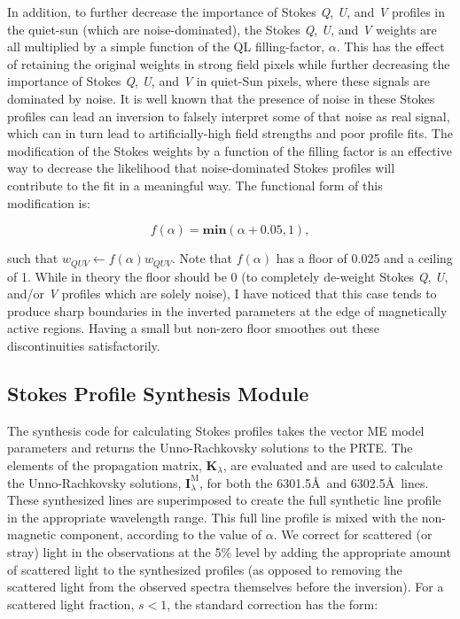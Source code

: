 \documentclass[11pt]{article}
\begin{document}
In addition, to further decrease the importance of Stokes \textit{Q}, \textit{U}, and \textit{V}
profiles in the quiet-sun (which are noise-dominated), the Stokes \textit{Q}, \textit{U}, and \textit{V} weights are all
multiplied by a simple function of the QL filling-factor, $\alpha$.  This has the effect of retaining the
original weights in strong field pixels while further decreasing the importance of Stokes \textit{Q},
\textit{U}, and \textit{V} in quiet-Sun pixels, where these signals are dominated by noise.  It is
well known that the presence of noise in these Stokes profiles can lead an inversion to falsely
interpret some of that noise as real signal, which can in turn lead to artificially-high field strengths
and poor profile fits.  The modification of the Stokes weights by a function of the filling factor
is an effective way to decrease the likelihood that noise-dominated Stokes profiles will contribute
to the fit in a meaningful way.  The functional form of this modification is:

\begin{equation}
f(\alpha) = \mathrm{\mathbf{min}}\left(\alpha+0.05,1\right), 
\end{equation}

such that $w_{QUV} \leftarrow f(\alpha)w_{QUV}$.
Note that $f(\alpha)$ has a floor of 0.025 and a ceiling of 1.  While in theory the floor should be 0
(to completely de-weight Stokes \textit{Q}, \textit{U}, and/or \textit{V} profiles which are solely
noise), I have noticed that this case tends to produce sharp boundaries in the inverted parameters at
the edge of magnetically active regions.  Having a small but non-zero floor smoothes out these
discontinuities satisfactorily.

\subsection{Stokes Profile Synthesis Module}\label{s:syn}
The synthesis code for calculating Stokes profiles takes the vector ME model parameters
and returns the Unno-Rachkovsky solutions to the PRTE.  The elements of the propagation
matrix, $\mathbf{K}_{\lambda}$, are evaluated and are used to calculate the Unno-Rachkovsky
solutions, $\mathbf{I}^{\mathrm{M}}_{\lambda}$, for both the 6301.5\AA\ and 6302.5\AA\ lines.
These synthesized lines are superimposed to create the full synthetic line profile in the 
appropriate wavelength range.  This full line profile is mixed with the non-magnetic
component, according to the value of $\alpha$.  We correct for scattered (or stray) light
in the observations at the 5\% level by adding the appropriate amount of scattered light
to the synthesized profiles (as opposed to removing the scattered light from the observed
spectra themselves before the inversion).  For a scattered light fraction, $s < 1$, the 
standard correction has the form:
\end{document}

